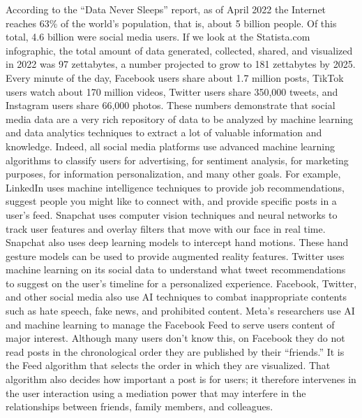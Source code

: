 According to the ``Data Never Sleeps'' report, as of April 2022 the Internet reaches 63\% of the world's population, that is, about 5 billion people. Of this total, 4.6 billion were social media users. If we look at the Statista.com infographic, the total amount of data generated, collected, shared, and visualized in 2022 was 97 zettabytes, a number projected to grow to 181 zettabytes by 2025. Every minute of the day, Facebook users share about 1.7 million posts, TikTok users watch about 170 million videos, Twitter users share 350,000 tweets, and Instagram users share 66,000 photos. These numbers demonstrate that social media data are a very rich repository of data to be analyzed by machine learning and data analytics techniques to extract a lot of valuable information and knowledge. Indeed, all social media platforms use advanced machine learning algorithms to classify users for advertising, for sentiment analysis, for marketing purposes, for information personalization, and many other goals. For example, LinkedIn uses machine intelligence techniques to provide job recommendations, suggest people you might like to connect with, and provide specific posts in a user's feed. Snapchat uses computer vision techniques and neural networks to track user features and overlay filters that move with our face in real time. Snapchat also uses deep learning models to intercept hand motions. These hand gesture models can be used to provide augmented reality features. Twitter uses machine learning on its social data to understand what tweet recommendations to suggest on the user's timeline for a personalized experience. Facebook, Twitter, and other social media also use AI techniques to combat inappropriate contents such as hate speech, fake news, and prohibited content. Meta's researchers use AI and machine learning to manage the Facebook Feed to serve users content of major interest. Although many users don't know this, on Facebook they do not read posts in the chronological order they are published by their ``friends.'' It is the Feed algorithm that selects the order in which they are visualized. That algorithm also decides how important a post is for users; it therefore intervenes in the user interaction using a mediation power that may interfere in the relationships between friends, family members, and colleagues.

